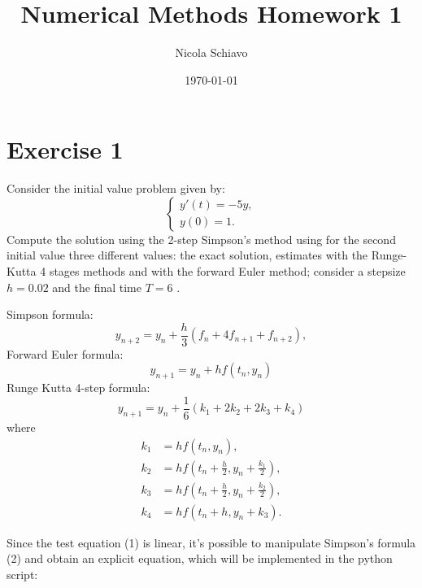 \documentclass[a4paper,12pt]{article}
\title{Numerical Methods Homework 1}
\author{Nicola Schiavo}
\date{\today}
\begin{document}
\maketitle

\section{Exercise 1}

Consider the initial value problem given by:
\begin{equation}
\begin{cases}
y'(t) = -5y , \\
y(0) = 1.
\end{cases}
\end{equation}
Compute the solution using the 2-step Simpson's method using for the second initial value three different values: the exact solution, estimates with the Runge-Kutta 4 stages methods and with the forward Euler method; consider a stepsize $h = 0.02$ and the final time $T = 6$ .

Simpson formula:  \begin{equation}
    y_{n+2} = y_n + \frac{h}{3} (f_n + 4f_{n+1} + f_{n+2}),
\end{equation}
Forward Euler formula:
\begin{equation}
y_{n+1} = y_n + hf(t_n, y_n)
\end{equation}
Runge Kutta 4-step formula:
\begin{equation}
y_{n+1} = y_n + \frac{1}{6}(k_1 + 2k_2 + 2k_3 + k_4)
\end{equation}
where
\begin{align*}
k_1 &= hf(t_n, y_n), \\
k_2 &= hf\left(t_n + \frac{h}{2}, y_n + \frac{k_1}{2}\right), \\
k_3 &= hf\left(t_n + \frac{h}{2}, y_n + \frac{k_2}{2}\right), \\
k_4 &= hf(t_n + h, y_n + k_3).
\end{align*}

Since the test equation (1) is linear, it's possible to manipulate Simpson's formula (2) and obtain an explicit equation, which will be implemented in the python script:
\end{document}

